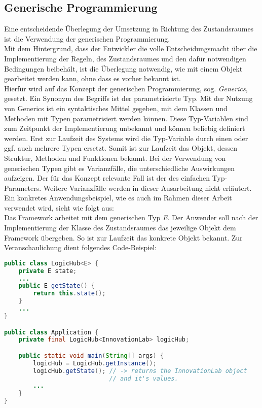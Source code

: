 \subsection{Generische Programmierung} %
Eine entscheidende Überlegung der Umsetzung in Richtung des Zustandsraumes ist die Verwendung der generischen Programmierung. 
\\
Mit dem Hintergrund, dass der Entwickler die volle Entscheidungsmacht über die Implementierung der 
Regeln, des Zustandsraumes und den dafür notwendigen Bedingungen beibehält, ist die Überlegung  
notwendig, wie mit einem Objekt gearbeitet werden kann, ohne dass es vorher bekannt ist. 
\\
\linebreak
Hierfür wird auf das Konzept der generischen Programmierung, sog. \textit{Generics}, gesetzt. Ein Synonym 
des Begriffs ist der parametrisierte Typ. Mit der Nutzung von Generics ist ein syntaktisches Mittel 
gegeben, mit dem Klassen und Methoden mit Typen parametrisiert werden können. Diese Typ-Variablen sind zum 
Zeitpunkt der Implementierung unbekannt und können beliebig definiert werden. Erst zur Laufzeit des Systems 
wird die Typ-Variable durch einen oder ggf. auch mehrere Typen ersetzt. Somit ist zur Laufzeit das 
Objekt, dessen Struktur, Methoden und Funktionen bekannt. Bei der Verwendung von generischen Typen gibt es 
Varianzfälle, die unterschiedliche Auswirkungen aufzeigen. Der für das Konzept relevante Fall ist der des 
einfachen Typ-Parameters. Weitere Varianzfälle werden in dieser Ausarbeitung nicht erläutert. 
\\
\linebreak
Ein konkretes Anwendungsbeispiel, wie es 
auch im Rahmen dieser Arbeit verwendet wird, sieht wie folgt aus:
\\
Das Framework arbeitet mit dem generischen Typ \textit{E}. Der Anwender soll nach der Implementierung der Klasse des Zustandsraumes das 
jeweilige Objekt dem Framework übergeben. So ist zur Laufzeit das konkrete Objekt bekannt. Zur Veranschaulichung dient folgendes Code-Beispiel:
\begin{lstlisting}[language=Java, frame=lines, xleftmargin=\parindent, style=algoBericht, label={code:generics}, captionpos=b, caption={Zustandsobjekt als Typ-Variable}]
public class LogicHub<E> {
    private E state;
    ...
    public E getState() {
        return this.state();
    }
    ...
}

public class Application {
    private final LogicHub<InnovationLab> logicHub;

    public static void main(String[] args) {
        logicHub = LogicHub.getInstance();
        logicHub.getState(); // -> returns the InnovationLab object 
                             // and it's values.
        ...
    }
}
\end{lstlisting}
